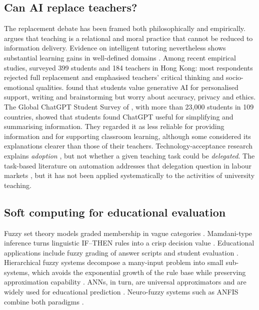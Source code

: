 \documentclass[preprint,12pt,authoryear]{elsarticle}
\theoremstyle{remark}
\begin{document}
\subsection{Can AI replace teachers?}
The replacement debate has been framed both philosophically and empirically. \citet{selwyn2019} argues that teaching is a relational and moral practice that cannot be reduced to information delivery. Evidence on intelligent tutoring nevertheless shows substantial learning gains in well-defined domains \citep{vanlehn2011,kulik2016}. Among recent empirical studies, \citet{chantsi2024} surveyed 399 students and 184 teachers in Hong Kong: most respondents rejected full replacement and emphasised teachers' critical thinking and socio-emotional qualities. \citet{chanhu2023} found that students value generative AI for personalised support, writing and brainstorming but worry about accuracy, privacy and ethics. The Global ChatGPT Student Survey of \citet{ravselj2025}, with more than 23,000 students in 109 countries, showed that students found ChatGPT useful for simplifying and summarising information. They regarded it as less reliable for providing information and for supporting classroom learning, although some considered its explanations clearer than those of their teachers. Technology-acceptance research explains \emph{adoption} \citep{venkatesh2003}, but not whether a given teaching task could be \emph{delegated}. The task-based literature on automation addresses that delegation question in labour markets \citep{autor2003,frey2017,eloundou2024}, but it has not been applied systematically to the activities of university teaching.

\subsection{Soft computing for educational evaluation}
Fuzzy set theory models graded membership in vague categories \citep{zadeh1965}. Mamdani-type inference turns linguistic IF--THEN rules into a crisp decision value \citep{mamdani1975,ross2010}. Educational applications include fuzzy grading of answer scripts and student evaluation \citep{biswas1995,chenlee1999}. Hierarchical fuzzy systems decompose a many-input problem into small sub-systems, which avoids the exponential growth of the rule base while preserving approximation capability \citep{wang1998}. ANNs, in turn, are universal approximators \citep{hornik1989} and are widely used for educational prediction \citep{romero2020}. Neuro-fuzzy systems such as ANFIS combine both paradigms \citep{jang1993}.
\end{document}

